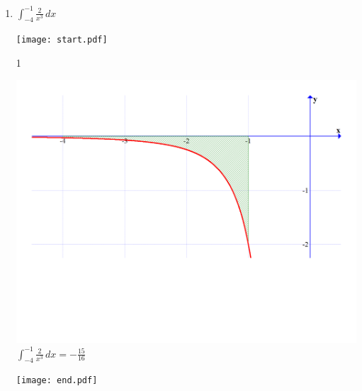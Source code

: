 \documentclass[12pt]{article}
\begin{document}
\begin{enumerate}
\item $\int_{-4}^{-1}\frac{2}{x^3}\,dx$

\texttt{[image: start.pdf]}
{{{1\linewidth}{\begin{center}\includegraphics[scale=0.2]{4.pdf}\\
$\int_{-4}^{-1}{\frac{2}{x^3}} \,dx=-\frac{15}{16}$\end{center}}}}
\texttt{[image: end.pdf]}


\end{enumerate}

\end{document}

